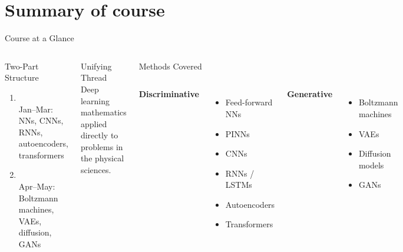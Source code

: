 \documentclass[aspectratio=169,11pt]{beamer}
\begin{document}
\section{Summary of course}
\begin{frame}{Course at a Glance}
  \begin{columns}[T]
      \begin{block}{Two-Part Structure}
        \begin{enumerate}\itemsep2pt
          \item {}\\
                {\footnotesize Jan--Mar: NNs, CNNs, RNNs,
                autoencoders, transformers}
          \item {}\\
                {\footnotesize Apr--May: Boltzmann machines,
                VAEs, diffusion, GANs}
        \end{enumerate}
      \end{block}
      \vspace{3pt}
      \begin{alertblock}{Unifying Thread}
        Deep learning mathematics applied
        directly to problems in the physical sciences.
      \end{alertblock}
      \begin{block}{Methods Covered}
        \begin{columns}[T]
          {\small\textbf{Discriminative}}
          \begin{itemize}\small\itemsep1pt
            \item Feed-forward NNs
            \item PINNs
            \item CNNs
            \item RNNs / LSTMs
            \item Autoencoders
            \item Transformers
          \end{itemize}
          {\small\textbf{Generative}}
          \begin{itemize}\small\itemsep1pt
            \item Boltzmann machines
            \item VAEs
            \item Diffusion models
            \item GANs
          \end{itemize}
        \end{columns}
      \end{block}
  \end{columns}
\end{frame}
\end{document}
